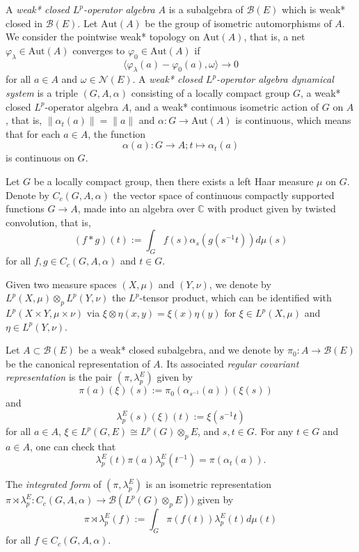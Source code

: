\documentclass[reqno,11pt]{amsart}
\theoremstyle{plain}
\theoremstyle{definition}
\theoremstyle{remark}
\newcommand{\B}{\mathcal{B}}
\newcommand{\la}{\langle}
\newcommand{\ra}{\rangle}
\begin{document}
A {\it weak* closed $L^p$-operator algebra $A$} is a subalgebra of $\B(E)$ which is weak* closed in $\mathcal{B}(E)$.
Let $\mathrm{Aut}(A)$ be the group of isometric automorphisms of $A$. We consider the pointwise weak* topology on $\mathrm{Aut}(A)$, that is, a net $\varphi_\lambda\in \mathrm{Aut}(A)$ converges to $\varphi_0\in \mathrm{Aut}(A)$ if $$\la\varphi_\lambda(a)-\varphi_0(a),\omega\ra\rightarrow 0$$ for all $a\in A$ and $\omega\in \mathcal{N}(E)$. A {\it weak* closed $L^p$-operator algebra dynamical system} is a triple $(G,A,\alpha)$ consisting of a locally compact group $G$, a weak* closed $L^p$-operator algebra $A$, and a weak* continuous isometric action of $G$ on $A$, that is, $\|\alpha_t(a)\|=\|a\|$ and $\alpha:G\rightarrow \mathrm{Aut}(A)$ is continuous, which means that for each $a\in A$, the function $$\alpha(a):G\rightarrow A;t\mapsto\alpha_t(a)$$ is continuous on $G$.



Let $G$ be a locally compact group, then there exists a left Haar measure $\mu$ on $G$.
Denote by $C_{c}(G,A,\alpha)$ the vector space of continuous compactly supported functions $G\rightarrow A$, made into an algebra over $\mathbb{C}$ with product given by twisted convolution, that is, $$(f*g)(t):=\int_{G}f(s)\alpha_{s}(g(s^{-1}t))d\mu(s)$$ for all $f,g\in C_{c}(G,A,\alpha)$ and $t\in G$.

Given two measure spaces $(X,\mu)$ and $(Y,\nu)$, we denote by $L^p(X,\mu)\otimes_p L^p(Y,\nu)$ the $L^p$-tensor product, which can be identified with $L^p(X\times Y,\mu\times\nu)$ via $\xi\otimes\eta(x,y)=\xi(x)\eta(y)$ for $\xi\in L^p(X,\mu)$ and $\eta\in L^p(Y,\nu)$.

Let $A\subset\mathcal{B}(E)$ be a weak* closed subalgebra, and
we denote by $\pi_0:A\rightarrow \mathcal{B}(E)$ be the canonical representation of $A$. Its associated {\it regular covariant representation} is the pair $(\pi,\lambda_p^E)$ given by
$$\pi(a)(\xi)(s):=\pi_{0}\left(\alpha_{s^{-1}}(a)\right)(\xi(s)) \quad$$ and $$\lambda_p^{E}(s)(\xi)(t):=\xi(s^{-1}t)$$
for all $a\in A$, $\xi\in L^{p}(G,E)\cong L^p(G)\otimes_p E$, and $s,t\in G$.
For any $t\in G$ and $a\in A$, one can check that $$\lambda_p^E(t)\pi(a)\lambda_p^E(t^{-1})=\pi(\alpha_t(a)).$$

The {\it integrated form} of $(\pi,\lambda_p^E)$ is an isometric representation $\pi\rtimes\lambda_p^E:C_c(G,A,\alpha)\rightarrow \mathcal{B}(L^p(G)\otimes_p E))$ given by $$\pi\rtimes\lambda_p^E(f):=\int_G \pi(f(t))\lambda_p^E(t)d\mu(t)$$ for all $f\in C_c(G,A,\alpha)$.
\end{document}
